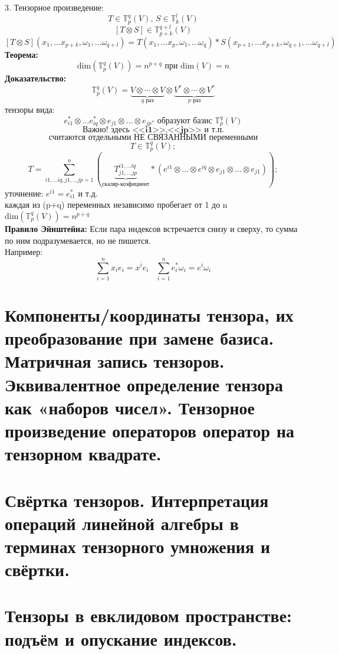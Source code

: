 \documentclass[12pt]{article}
\begin{document}
3. Тензорное произведение:\\
\[
T\in  \mathbb{T}^q_p(V) \textbf{, }S \in  \mathbb{T}^l_k(V)
\]
\[
[T \otimes S] \in \mathbb{T}^{q+l}_{p+k}(V)
\]
\[
[T \otimes S](x_1,...x_{p+k},\omega_1,...\omega_{q+l})=T(x_1,...x_p,\omega_1,...\omega_q)*S(x_{p+1},...x_{p+k},\omega_{q+1},...\omega_{q+l})
\]
\textbf{Теорема:}
\[
\mathrm{dim}(\mathbb{T}^q_p(V))=n^{p+q} \textbf{ при } \mathrm{dim}(V)=n
\]
\textbf{Доказательство:}\\
\[
\mathbb{T}^q_p(V)=\underbrace{V \otimes \cdots \otimes V}_{q \text{ раз}} \otimes \underbrace{V^* \otimes \cdots \otimes V^*}_{p \text{ раз}}
\]
тензоры вида:
\[
e_{i1}^* \otimes ... e_{iq}^* \otimes e_{j1} \otimes ...\otimes e_{jp} \textbf{- образуют базис } \mathbb{T}^q_p(V)
\]
\[\textbf{Важно! здесь <<i1>>,<<jp>> и т.п.}\]
\[\textbf{считаются отдельными НЕ СВЯЗАННЫМИ переменными}\]
\[
T \in \mathbb{T}^q_p(V);
\]
\[
T =\sum_{i1, ... iq, j1, ... jp=1}^n (\underbrace{T^{i1, ... iq}_{j1, ... jp}}_\text{скаляр-коэфициент}*(e^{i1}\otimes ...\otimes e^{iq} \otimes e_{j1} \otimes...\otimes e_{j1}));
\]
уточнение: \(e^{i1}=e^*_{i1}\) и т.д.\\
каждая из (p+q) переменных независимо пробегает от 1 до n \Rightarrow \(\mathrm{dim}(\mathbb{T}^q_p(V))=n^{p+q}\)\\
\textbf{Правило Эйнштейна:}
Если пара индексов встречается снизу и сверху, то сумма по ним подразумевается, но не пишется.\\
Например:
\[
\sum^{n}_{i=1}x_ie_i=x^ie_i \ \ \ \ \sum^n_{i=1}e_i^*\omega_i=e^i\omega_i
\]


\section{Компоненты/координаты тензора, их преобразование при замене базиса. Матричная запись тензоров. Эквивалентное определение тензора как «наборов чисел». Тензорное произведение операторов оператор на тензорном квадрате.}

\section{Свёртка тензоров. Интерпретация операций линейной алгебры в терминах тензорного умножения и свёртки.}

\section{Тензоры в евклидовом пространстве: подъём и опускание индексов.}
\end{document}
